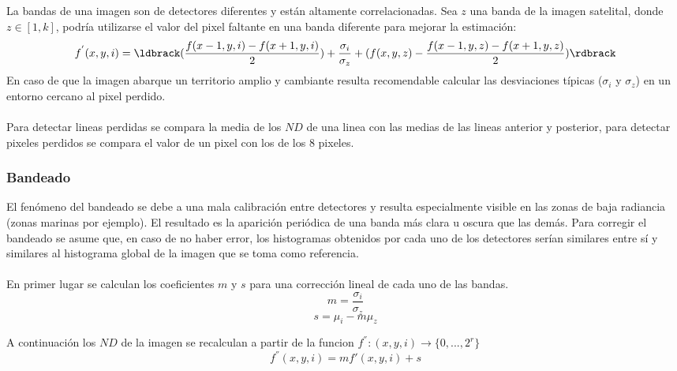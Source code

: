 La bandas de una imagen son de detectores diferentes y est\'an altamente correlacionadas. Sea  $ z $ una banda de la imagen satelital, donde $ z \in [1,k] $, podr\'ia utilizarse el valor del pixel faltante en una banda diferente para mejorar la estimaci\'on:
		\begin{equation}
		f^{'}(x,y,i) = \ldbrack (\dfrac{f(x-1,y,i)-f(x+1,y,i)}{2})+ \dfrac{\sigma_{i}}{\sigma_{z}} +(f(x,y,z)-\dfrac{f(x-1,y,z)-f(x+1,y,z)}{2}) \rdbrack
		\end{equation} 
En caso de que la imagen abarque un territorio amplio y cambiante resulta recomendable calcular las desviaciones t\'ipicas ($ \sigma_{i} $ y $ \sigma_{z} $) en un entorno cercano al pixel perdido.\\~\\
Para detectar lineas perdidas se compara la media de los $ ND $ de una linea con las medias de las lineas anterior y posterior, para detectar pixeles perdidos se compara el valor de un pixel con los de los 8 pixeles.
\subsubsection{Bandeado}\label{subsec:bandeado}
El fen\'omeno del bandeado se debe a una mala calibraci\'on entre detectores y resulta especialmente visible en las zonas de baja radiancia (zonas marinas por ejemplo). El resultado es la aparici\'on peri\'odica de una banda m\'as clara u oscura que las dem\'as.
Para corregir el bandeado se asume que, en caso de no haber error, los histogramas obtenidos por cada uno de los detectores ser\'ian similares entre s\'i y similares al histograma global de la imagen que se toma como referencia.\\~\\
En primer lugar se calculan los coeficientes $ m $ y $ s $ para una correcci\'on lineal de cada uno de las bandas.
		\begin{equation}
		m =\dfrac{\sigma_{i}}{\sigma_{z}}
		\end{equation} 	
				\begin{equation}
				s=\mu_{i} - m\mu_{z}
				\end{equation} 	
				

A continuaci\'on los $ ND $ de la imagen se recalculan a partir de la funcion $ f^{''}:(x,y,i) \longrightarrow \{0,...,2^{r}\} $
				\begin{equation}
				f^{''}(x,y,i) = m f'(x,y,i) + s
				\end{equation} 				


